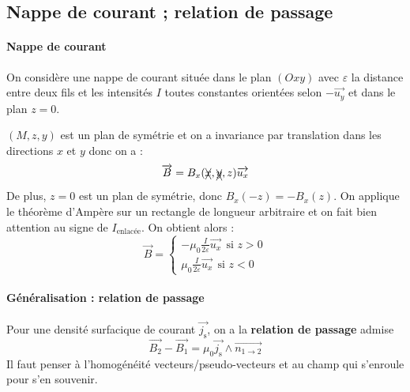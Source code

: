 \documentclass[french]{book}
\theoremstyle{plain}
\theoremstyle{definition}
\theoremstyle{remark}
\begin{document}
\subsection{Nappe de courant ; relation de passage}
\paragraph{Nappe de courant} On considère une nappe de courant située dans le plan $(Oxy)$ avec $\varepsilon$ la distance entre deux fils et les intensités $I$ toutes constantes orientées selon $-\overrightarrow{u_y}$ et dans le plan $z=0$. \\ \par $(M,z,y)$ est un plan de symétrie et on a invariance par translation dans les directions $x$ et $y$ donc on a : $$\overrightarrow{B}=B_x(\xcancel{x},\xcancel{y},z)\overrightarrow{u_x}$$ De plus, $z=0$ est un plan de symétrie, donc $B_x(-z)=-B_x(z)$. On applique le théorème d'Ampère sur un rectangle de longueur arbitraire et on fait bien attention au signe de $I_\text{enlacée}$. On obtient alors : $$\overrightarrow{B}=\begin{cases}
	\displaystyle -\mu_0\frac{I}{2\varepsilon}\overrightarrow{u_x} \ \ \text{si }z>0 \\[3mm]
	\displaystyle \mu_0\frac{I}{2\varepsilon}\overrightarrow{u_x} \ \ \text{si }z<0
\end{cases}$$
\paragraph{Généralisation : relation de passage}
Pour une densité surfacique de courant $\overrightarrow{j_\text{s}}$, on a la \textbf{relation de passage} admise $$\overrightarrow{B_2}-\overrightarrow{B_1}=\mu_0\overrightarrow{j_\text{s}}\wedge\overrightarrow{n_{1\to 2}}$$ Il faut penser à l’homogénéité vecteurs/pseudo-vecteurs et au champ qui s’enroule pour s'en souvenir.
\end{document}

